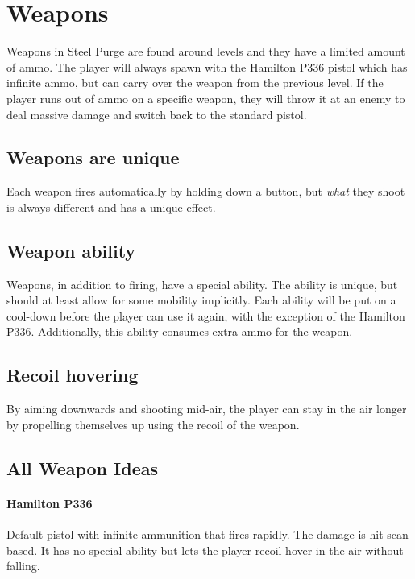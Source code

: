 \documentclass[../Main.tex]{subfiles}
\begin{document}
\section{Weapons}

Weapons in Steel Purge are found around levels and they have a limited amount of ammo. The player will always spawn with the Hamilton P336 pistol which has infinite ammo, but can carry over the weapon from the previous level. If the player runs out of ammo on a specific weapon, they will throw it at an enemy to deal massive damage and switch back to the standard pistol. 

\subsection{Weapons are unique}

Each weapon fires automatically by holding down a button, but \emph{what} they shoot is always different and has a unique effect. 

\subsection{Weapon ability}

Weapons, in addition to firing, have a special ability. The ability is unique, but should at least allow for some mobility implicitly. Each ability will be put on a cool-down before the player can use it again, with the exception of the Hamilton P336. Additionally, this ability consumes extra ammo for the weapon.

\subsection{Recoil hovering}

By aiming downwards and shooting mid-air, the player can stay in the air longer by propelling themselves up using the recoil of the weapon. 

\subsection{All Weapon Ideas}

\paragraph{Hamilton P336} 

Default pistol with infinite ammunition that fires rapidly. The damage is hit-scan based. It has no special ability but lets the player recoil-hover in the air without falling.
\end{document}
